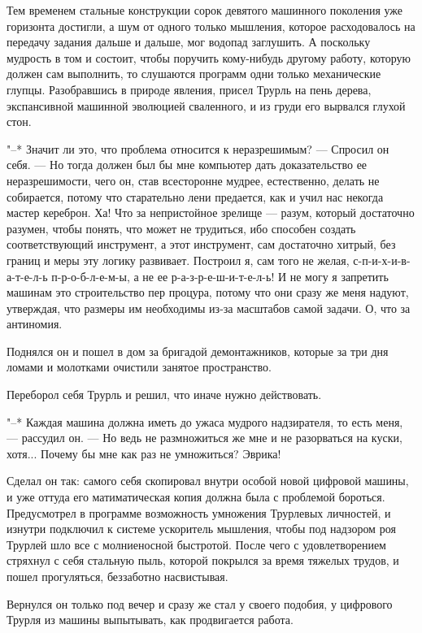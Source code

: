 Тем временем стальные конструкции сорок девятого
машинного поколения уже горизонта достигли, а шум от одного
только мышления, которое расходовалось на передачу задания
дальше и дальше, мог водопад заглушить. А поскольку мудрость
в том и состоит, чтобы поручить кому-нибудь другому работу,
которую должен сам выполнить, то слушаются программ одни
только механические глупцы. Разобравшись в природе явления,
присел Трурль на пень дерева, экспансивной машинной
эволюцией сваленного, и из груди его вырвался глухой стон.

"--* Значит ли это, что проблема относится к неразрешимым? --- Спросил
он себя. --- Но тогда должен был бы мне компьютер
дать доказательство ее неразрешимости, чего он, став
всесторонне мудрее, естественно, делать не собирается,
потому что старательно лени предается, как и учил нас
некогда мастер кереброн. Ха! Что за непристойное зрелище --- разум,
который достаточно разумен, чтобы понять, что может
не трудиться, ибо способен создать соответствующий
инструмент, а этот инструмент, сам достаточно хитрый, без
границ и меры эту логику развивает. Построил я, сам того не
желая, с-п-и-х-и-в-а-т-е-л-ь п-р-о-б-л-е-м-ы, а не ее
р-а-з-р-е-ш-и-т-е-л-ь! И не могу я запретить машинам это
строительство пер процура, потому что они сразу же меня
надуют, утверждая, что размеры им необходимы из-за масштабов
самой задачи. О, что за антиномия.

Поднялся он и пошел в дом за бригадой демонтажников,
которые за три дня ломами и молотками очистили занятое
пространство.

Переборол себя Трурль и решил, что иначе нужно
действовать.

"--* Каждая машина должна иметь до ужаса мудрого
надзирателя, то есть меня, --- рассудил он. --- Но ведь не
размножиться же мне и не разорваться на куски, хотя...
Почему бы мне как раз не умножиться? Эврика!

Сделал он так: самого себя скопировал внутри особой новой
цифровой машины, и уже оттуда его матиматическая копия
должна была с проблемой бороться. Предусмотрел в программе
возможность умножения Трурлевых личностей, и изнутри
подключил к системе ускоритель мышления, чтобы под надзором
роя Трурлей шло все с молниеносной быстротой. После чего с
удовлетворением стряхнул с себя стальную пыль, которой
покрылся за время тяжелых трудов, и пошел прогуляться,
беззаботно насвистывая.

Вернулся он только под вечер и сразу же стал у своего
подобия, у цифрового Трурля из машины выпытывать, как
продвигается работа.

